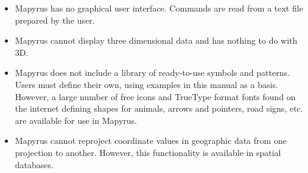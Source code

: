 \begin{itemize}

\item
Mapyrus has no graphical user interface.
Commands are read from a text file prepared by the user.

\item
Mapyrus cannot display three dimensional data and has nothing to do
with 3D.

\item
Mapyrus does not include a library of ready-to-use symbols and patterns.
Users must define their own, using examples in this manual as a basis.
However, a large number of free icons
and TrueType format fonts found on the internet
defining shapes for animals, arrows and pointers, road signs, etc. are
available for use in Mapyrus.

\item
Mapyrus cannot reproject coordinate values in geographic data from
one projection to another.  However, this functionality
is available in spatial databases.
\end{itemize}

